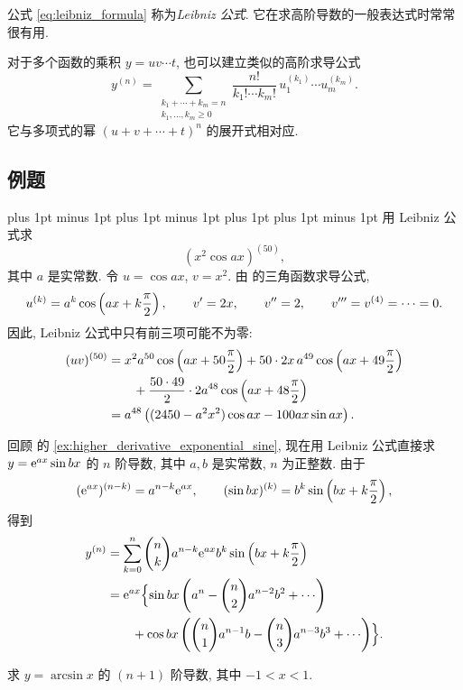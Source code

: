 公式 \eqref{eq:leibniz_formula} 称为\emph{Leibniz 公式}.
它在求高阶导数的一般表达式时常常很有用.

对于多个函数的乘积 $y=uv\cdots t$, 也可以建立类似的高阶求导公式
$$
y^{(n)}=
\sum_{\substack{k_1+\cdots+k_m=n\\k_1,\ldots,k_m\geqslant0}}
\frac{n!}{k_1!\cdots k_m!}\,
u_1^{(k_1)}\cdots u_m^{(k_m)}.
$$
它与多项式的幂 $(u+v+\cdots+t)^n$ 的展开式相对应.

\subsection{例题}\label{subsec:118}

\begingroup
\abovedisplayskip=6pt plus 1pt minus 1pt
\belowdisplayskip=6pt plus 1pt minus 1pt
\abovedisplayshortskip=6pt plus 1pt
\belowdisplayshortskip=6pt plus 1pt minus 1pt
\label{ex:leibniz_fiftieth_derivative}
用 Leibniz 公式求 $$(x^2\cos ax)^{(50)},$$ 其中 $a$ 是实常数.
令 $u=\cos ax$, $v=x^2$.
由  的三角函数求导公式,
$$
u^{(k)}=a^k\cos\left( ax+k\frac\pi2 \right),\qquad
v'=2x,\qquad v''=2,\qquad v'''=v^{(4)}=\cdots=0.
$$
因此, Leibniz 公式中只有前三项可能不为零:
$$
\begin{aligned}
(uv)^{(50)}
&=x^2a^{50}\cos\left( ax+50\frac\pi2 \right)+50\cdot2x\,a^{49}\cos\left( ax+49\frac\pi2 \right)\\
&\qquad+\frac{50\cdot49}{2}\cdot2a^{48}\cos\left( ax+48\frac\pi2 \right)\\
&=a^{48}\left( (2450-a^2x^2)\cos ax-100ax\sin ax \right).
\end{aligned}
$$

\label{ex:leibniz_exponential_trigonometric}
回顾  的 \ref{ex:higher_derivative_exponential_sine},
现在用 Leibniz 公式直接求 $y=\mathrm{e}^{ax}\sin bx$ 的 $n$ 阶导数, 其中 $a,b$ 是实常数, $n$ 为正整数.
由于
$$
(\mathrm{e}^{ax})^{(n-k)}=a^{n-k}\mathrm{e}^{ax},\qquad
(\sin bx)^{(k)}=b^k\sin\left( bx+k\frac\pi2 \right),
$$
得到
$$
\begin{aligned}
y^{(n)}&=\sum_{k=0}^{n}\binom nk a^{n-k}\e^{ax}b^k\sin\brac{bx+k\frac\pi2}\\
&=\e^{ax}\Bigl\{
\sin bx\brac{a^n-\binom n2a^{n-2}b^2+\cdots}\\
&~~~~~~+\cos bx\brac{\binom n1a^{n-1}b-\binom n3a^{n-3}b^3+\cdots}\Bigr\}.
\end{aligned}
$$

\label{ex:leibniz_arcsine_derivative}
求 $y=\arcsin x$ 的 $(n+1)$ 阶导数, 其中 $-1<x<1$.

